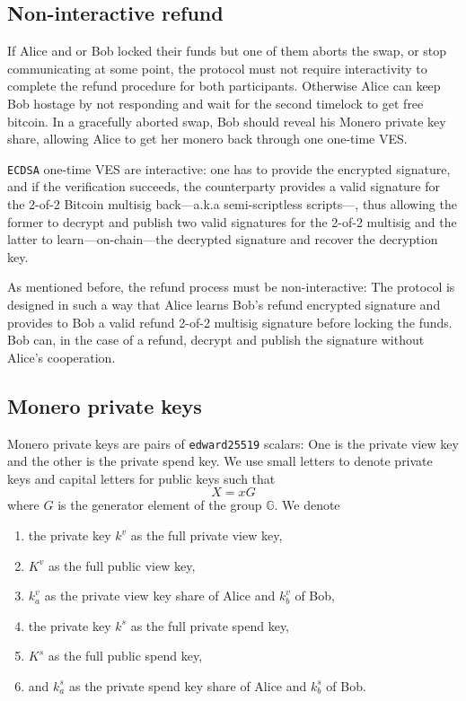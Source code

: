 \documentclass{llncs}
\newcommand{\GG}{\mathbb{G}}
\begin{document}
\subsection{Non-interactive refund}
If Alice and or Bob locked their funds but one of them aborts the swap, or stop communicating at some point, the protocol must not require interactivity to complete the refund procedure for both participants. Otherwise Alice can keep Bob hostage by not responding and wait for the second timelock to get free bitcoin. In a gracefully aborted swap, Bob should reveal his Monero private key share, allowing Alice to get her monero back through one one-time VES.

\texttt{ECDSA} one-time VES are interactive: one has to provide the encrypted signature, and if the verification succeeds, the counterparty provides a valid signature for the 2-of-2 Bitcoin multisig back---a.k.a semi-scriptless scripts---, thus allowing the former to decrypt and publish two valid signatures for the 2-of-2 multisig and the latter to learn---on-chain---the decrypted signature and recover the decryption key.

As mentioned before, the refund process must be non-interactive: The protocol is designed in such a way that Alice learns Bob's refund encrypted signature and provides to Bob a valid refund 2-of-2 multisig signature before locking the funds. Bob can, in the case of a refund, decrypt and publish the signature without Alice's cooperation.

\subsection{Monero private keys}
Monero private keys are pairs of \texttt{edward25519} scalars: One is the private view key and the other is the private spend key. We use small letters to denote private keys and capital letters for public keys such that
$$X = xG$$
where $G$ is the generator element of the group $\GG$. We denote
\begin{enumerate}[label=(\roman*)]
    \item the private key $k^v$ as the full private view key,
    \item $K^v$ as the full public view key,
    \item $k^v_a$ as the private view key share of Alice and $k^v_b$ of Bob,
    \item the private key $k^s$ as the full private spend key,
    \item $K^s$ as the full public spend key,
    \item and $k^s_a$ as the private spend key share of Alice and $k^s_b$ of Bob.
\end{enumerate}
\end{document}
